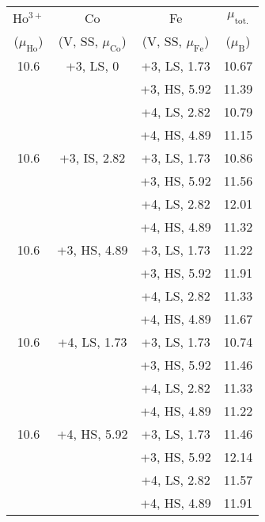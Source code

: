 \documentclass[12pt,twocolumns]{iopart}
\begin{document}
\begin{center}
\begin{table}[!b]
\begin{tabular}[h]{cccc}
			\hline
			Ho$^{3+}$        &   Co                                        & Fe     &  $\mu_\mathrm{tot.}$    \\
			($\mu_\mathrm{Ho}$)  & (V, SS, $\mu_\mathrm{Co}$)     & (V, SS, $\mu_\mathrm{Fe}$)   & ($\mu_\mathrm{B}$) \\ \hline\hline
			10.6                 & +3, LS, 0                                   & +3, LS, 1.73             & 10.67  \\
			&                                             & +3, HS, 5.92             & 11.39  \\
			&                                             & +4, LS, 2.82             & 10.79  \\
			&                                             & +4, HS, 4.89             & 11.15  \\  \hline
			10.6                 & +3, IS, 2.82                                & +3, LS, 1.73             & 10.86  \\
			&                                             & +3, HS, 5.92             & 11.56  \\
			&                                             & +4, LS, 2.82             & 12.01  \\
			&                                             & +4, HS, 4.89             & 11.32  \\  \hline
			10.6                 & +3, HS, 4.89                                & +3, LS, 1.73             & 11.22  \\
			&                                             & +3, HS, 5.92             & 11.91  \\
			&                                             & +4, LS, 2.82             & 11.33  \\
			&                                             & +4, HS, 4.89             & 11.67  \\  \hline
			10.6                 & +4, LS, 1.73                                & +3, LS, 1.73             & 10.74  \\
			&                                             & +3, HS, 5.92             & 11.46  \\
			&                                             & +4, LS, 2.82             & 11.33  \\
			&                                             & +4, HS, 4.89             & 11.22  \\  \hline
			10.6                 & +4, HS, 5.92                                & +3, LS, 1.73             & 11.46  \\
			&                                             & +3, HS, 5.92             & 12.14  \\
			&                                             & +4, LS, 2.82             & 11.57  \\
			&                                             & +4, HS, 4.89             & 11.91  \\  \hline\hline
			
			
		\end{tabular}
	\end{table}
\end{center}
\end{document}
